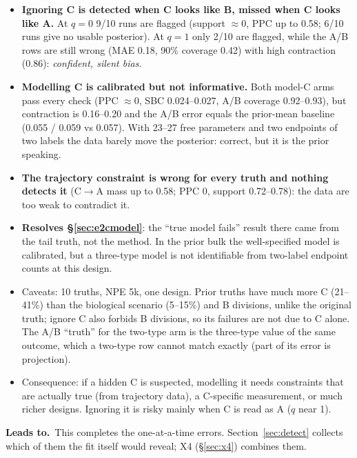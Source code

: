 \documentclass[10pt,a4paper]{article}
\newcommand{\Leads}[1]{\begin{leadbox}{\sffamily\bfseries\color{caqua!70!black}Leads to.}\ #1\end{leadbox}}
\newcommand{\sref}[1]{\S\ref{#1}}
\begin{document}
\begin{itemize}
\item \textbf{Ignoring C is detected when C looks like B, missed when C looks like A.} At $q=0$ 9/10 runs are flagged (support $\approx 0$, PPC up to 0.58; 6/10 runs give no usable posterior). At $q=1$ only 2/10 are flagged, while the A/B rows are still wrong (MAE 0.18, 90\% coverage 0.42) with high contraction (0.86): \emph{confident, silent bias}.
\item \textbf{Modelling C is calibrated but not informative.} Both model-C arms pass every check (PPC $\approx 0$, SBC 0.024--0.027, A/B coverage 0.92--0.93), but contraction is 0.16--0.20 and the A/B error equals the prior-mean baseline (0.055 / 0.059 vs 0.057). With 23--27 free parameters and two endpoints of two labels the data barely move the posterior: correct, but it is the prior speaking.
\item \textbf{The trajectory constraint is wrong for every truth and nothing detects it} (C$\to$A mass up to 0.58; PPC 0, support 0.72--0.78): the data are too weak to contradict it.
\item \textbf{Resolves \S\ref{sec:e2cmodel}}: the ``true model fails'' result there came from the tail truth, not the method. In the prior bulk the well-specified model is calibrated, but a three-type model is not identifiable from two-label endpoint counts at this design.
\item Caveats: 10 truths, NPE 5k, one design. Prior truths have much more C (21--41\%) than the biological scenario (5--15\%) and B divisions, unlike the original truth; ignore C also forbids B divisions, so its failures are not due to C alone. The A/B ``truth'' for the two-type arm is the three-type value of the same outcome, which a two-type row cannot match exactly (part of its error is projection).
\item Consequence: if a hidden C is suspected, modelling it needs constraints that are actually true (from trajectory data), a C-specific measurement, or much richer designs. Ignoring it is risky mainly when C is read as A ($q$ near 1).
\end{itemize}
\Leads{This completes the one-at-a-time errors. Section~\ref{sec:detect} collects which of them the fit itself would reveal; X4 (\sref{sec:x4}) combines them.}
\end{document}
